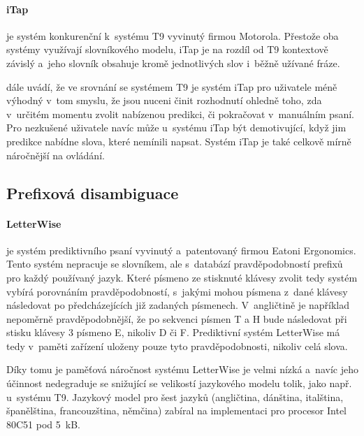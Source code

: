\documentclass[a4paper,11pt,openany]{book} %
\newcommand\exmp{\textsf}
\begin{document}
\paragraph{iTap}
je systém konkurenční k~systému T9 vyvinutý firmou Motorola. Přestože oba systémy využívají slovníkového modelu, iTap je na rozdíl od T9 kontextově závislý a~jeho slovník obsahuje kromě jednotlivých slov i~běžně užívané fráze. 

\parencite{davidmackay} dále uvádí, že ve srovnání se systémem T9 je systém iTap pro uživatele méně výhodný v~tom smyslu, že jsou nuceni činit rozhodnutí ohledně toho, zda v~určitém momentu zvolit nabízenou predikci, či pokračovat v~manuálním psaní. Pro nezkušené uživatele navíc může u~systému iTap být demotivující, když jim predikce nabídne slova, které nemínili napsat. Systém iTap je také celkově mírně náročnější na ovládání.

\subsection{Prefixová disambiguace}

\paragraph{LetterWise}

je systém prediktivního psaní vyvinutý a~patentovaný firmou Eatoni Ergonomics. Tento systém nepracuje se slovníkem, ale s~databází pravděpodobností prefixů pro každý používaný jazyk. Které písmeno ze stisknuté klávesy zvolit tedy systém vybírá porovnáním pravděpodobností, s~jakými mohou písmena z~dané klávesy následovat po předcházejících již zadaných písmenech. V~angličtině je například nepoměrně pravděpodobnější, že po sekvenci písmen \exmp{T} a \exmp{H} bude následovat při stisku klávesy \exmp{3} písmeno \exmp{E}, nikoliv \exmp{D} či \exmp{F}. Prediktivní systém LetterWise má tedy v~paměti zařízení uloženy pouze tyto pravděpodobnosti, nikoliv celá slova. \parencite{MacKenzie2001}

Díky tomu je paměťová náročnost systému LetterWise je velmi nízká a~navíc jeho účinnost nedegraduje se snižující se velikostí jazykového modelu tolik, jako např. u~systému T9. Jazykový model pro šest jazyků (angličtina, dánština, italština, španělština, francouzština, němčina) zabíral na implementaci pro procesor Intel 80C51 pod 5~kB. \parencite{eatoniletterwisereq} %
\end{document}
